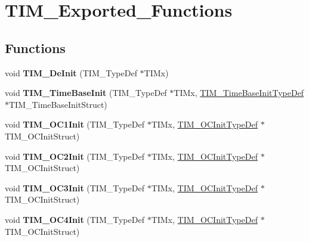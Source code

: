 \hypertarget{group__TIM__Exported__Functions}{
\section{TIM\_\-Exported\_\-Functions}
\label{group__TIM__Exported__Functions}
}
\subsection*{Functions}
\begin{DoxyCompactItemize}
\item 
\hypertarget{group__TIM__Exported__Functions_ga1659cc0ce503ac151568e0c7c02b1ba5}{
void {\bfseries TIM\_\-DeInit} (TIM\_\-TypeDef $\ast$TIMx)}
\label{group__TIM__Exported__Functions_ga1659cc0ce503ac151568e0c7c02b1ba5}

\item 
\hypertarget{group__TIM__Exported__Functions_ga83fd58c9416802d9638bbe1715c98932}{
void {\bfseries TIM\_\-TimeBaseInit} (TIM\_\-TypeDef $\ast$TIMx, \hyperlink{structTIM__TimeBaseInitTypeDef}{TIM\_\-TimeBaseInitTypeDef} $\ast$TIM\_\-TimeBaseInitStruct)}
\label{group__TIM__Exported__Functions_ga83fd58c9416802d9638bbe1715c98932}

\item 
\hypertarget{group__TIM__Exported__Functions_gafcdb6ff00158862aef7fed5e7a554a3e}{
void {\bfseries TIM\_\-OC1Init} (TIM\_\-TypeDef $\ast$TIMx, \hyperlink{structTIM__OCInitTypeDef}{TIM\_\-OCInitTypeDef} $\ast$TIM\_\-OCInitStruct)}
\label{group__TIM__Exported__Functions_gafcdb6ff00158862aef7fed5e7a554a3e}

\item 
\hypertarget{group__TIM__Exported__Functions_ga2017455121d910d6ff63ac6f219842c5}{
void {\bfseries TIM\_\-OC2Init} (TIM\_\-TypeDef $\ast$TIMx, \hyperlink{structTIM__OCInitTypeDef}{TIM\_\-OCInitTypeDef} $\ast$TIM\_\-OCInitStruct)}
\label{group__TIM__Exported__Functions_ga2017455121d910d6ff63ac6f219842c5}

\item 
\hypertarget{group__TIM__Exported__Functions_ga90d4a358d4e6d4c5ed17dc1d6beb5f30}{
void {\bfseries TIM\_\-OC3Init} (TIM\_\-TypeDef $\ast$TIMx, \hyperlink{structTIM__OCInitTypeDef}{TIM\_\-OCInitTypeDef} $\ast$TIM\_\-OCInitStruct)}
\label{group__TIM__Exported__Functions_ga90d4a358d4e6d4c5ed17dc1d6beb5f30}

\item 
\hypertarget{group__TIM__Exported__Functions_ga64571ebbb58cac39a9e760050175f11c}{
void {\bfseries TIM\_\-OC4Init} (TIM\_\-TypeDef $\ast$TIMx, \hyperlink{structTIM__OCInitTypeDef}{TIM\_\-OCInitTypeDef} $\ast$TIM\_\-OCInitStruct)}
\label{group__TIM__Exported__Functions_ga64571ebbb58cac39a9e760050175f11c}


\end{DoxyCompactItemize}
